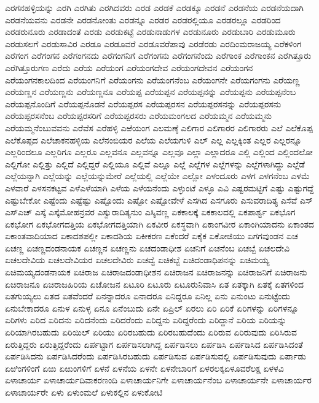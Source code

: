 {ಎರಗನಹಳ್ಳಿಯನ್ನು
ಎರಗಿ
ಎರಗಿತು
ಎರಗಿದವರು
ಎರಡ
ಎರಡಕೆ
ಎರಡಕ್ಕೂ
ಎರಡನೆ
ಎರಡನೆಯ
ಎರಡನೆಯದಾಗಿ
ಎರಡನೆಯವನು
ಎರಡನೇ
ಎರಡನೋಂತು
ಎರಡನ್ನೂ
ಎರಡರ
ಎರಡರಲ್ಲಿಯೂ
ಎರಡರಲ್ಲೂ
ಎರಡರಿಂದ
ಎರಡರುನೂರು
ಎರಡಾದಂತೆ
ಎರಡು
ಎರಡುಕಟ್ಟೆ
ಎರಡುನಾಡುಗಳ
ಎರಡುನೂರು
ಎರಡುಬಾರಿ
ಎರಡುಮೂರು
ಎರಡುಸಲಗೆ
ಎರಡುಸಾವಿರ
ಎರಡೂ
ಎರಡೂವರೆ
ಎರಡೂವರೆಪಾವು
ಎರಡೆರಡು
ಎರದಿಂಮರಾಜಯ್ಯ
ಎರೆಕಳಿಂಗ
ಎರೆಗಂಗ
ಎರೆಗಂಗನ
ಎರೆಗಂಗನದು
ಎರೆಗಂಗನಿಗೆ
ಎರೆಗಂಗನು
ಎರೆಗಂಗನೆಂದು
ಎರೆಗಾಂಕ
ಎರೆಗಾಂಕನ
ಎರೆಗಿತ್ತೂರು
ಎರೆಗಿತ್ತೂರುಗಣ
ಎರೆದು
ಎರೆಯ
ಎರೆಯಂಗ
ಎರೆಯಂಗದೇವ
ಎರೆಯಂಗದೇವನ
ಎರೆಯಂಗನ
ಎರೆಯಂಗನಕಾಲದಿಂದ
ಎರೆಯಂಗನಿಗೆ
ಎರೆಯಂಗನು
ಎರೆಯಂಗನೆಂಬ
ಎರೆಯಂಗನೇ
ಎರೆಯಗಂಗನು
ಎರೆಯಣ್ಣ
ಎರೆಯಣ್ಣನ
ಎರೆಯಣ್ಣನು
ಎರೆಯಣ್ಣನೂ
ಎರೆಯಪ್ಪ
ಎರೆಯಪ್ಪನ
ಎರೆಯಪ್ಪನನ್ನು
ಎರೆಯಪ್ಪನು
ಎರೆಯಪ್ಪನೆಂಬ
ಎರೆಯಪ್ಪನೊಂದಿಗೆ
ಎರೆಯಪ್ಪನೊಡನೆ
ಎರೆಯಪ್ಪರಸ
ಎರೆಯಪ್ಪರಸನ
ಎರೆಯಪ್ಪರಸನನ್ನು
ಎರೆಯಪ್ಪರಸನು
ಎರೆಯಪ್ಪರಸನೆಂಬ
ಎರೆಯಪ್ಪರಸರಿಗೆ
ಎರೆಯಪ್ಪರಸರು
ಎರೆಯಮಂಗಲದ
ಎರೆಯಮ್ಮನ
ಎರೆಯಮ್ಮನು
ಎರೆಯಮ್ಮನೆಂಬುವವನು
ಎರೆವೆಸ
ಎರೆಹಳ್ಳಿ
ಎಱೆಯಂಗ
ಎಲಮಣ್ಠೆ
ಎಲಿಗಾರ
ಎಲಿಗಾರರ
ಎಲಿಗಾರರು
ಎಲೆ
ಎಲೆಕೊಪ್ಪ
ಎಲೆಕೊಪ್ಪದ
ಎಲೆಚಾಕನಹಳ್ಳಿಯ
ಎಲೆನಂಬಿಯರ
ಎಲೆಯ
ಎಲೆಯಗುಳಿ
ಎಲ್
ಎಲ್ಲ
ಎಲ್ಲಕ್ಕಿಂತ
ಎಲ್ಲರ
ಎಲ್ಲರನ್ನೂ
ಎಲ್ಲರಿಂದಲೂ
ಎಲ್ಲರಿಗೂ
ಎಲ್ಲರೂ
ಎಲ್ಲವನೂ
ಎಲ್ಲವನ್ನೂ
ಎಲ್ಲವೂ
ಎಲ್ಲಾ
ಎಲ್ಲಾದರೂ
ಎಲ್ಲಿ
ಎಲ್ಲಿಂದ
ಎಲ್ಲಿಂದಲೋ
ಎಲ್ಲಿಗೋ
ಎಲ್ಲಿತ್ತು
ಎಲ್ಲಿದೆ
ಎಲ್ಲಿದ್ದರೆ
ಎಲ್ಲಿಯೂ
ಎಲ್ಲಿವೆ
ಎಲ್ಲೂ
ಎಲ್ಲೆ
ಎಲ್ಲೆಗಳ
ಎಲ್ಲೆಗಳನ್ನು
ಎಲ್ಲೆಗಳಾಗಿದ್ದು
ಎಲ್ಲೆಡೆ
ಎಲ್ಲೆಯನ್ನಾಗಿ
ಎಲ್ಲೆಯನ್ನು
ಎಲ್ಲೆಯನ್ನುಮೇರೆ
ಎಲ್ಲೆಯಲ್ಲಿ
ಎಲ್ಲೆಯೇ
ಎಲ್ಲೋ
ಎಳಂದೂರು
ಎಳಗ
ಎಳಗನೆಂಬ
ಎಳಮೆ
ಎಳವಾರೆ
ಎಳಸನಕಟ್ಟವ
ಎಳೆಎಳೆಯಾಗಿ
ಎಳೆಯ
ಎಳೆಯನೆಂದು
ಎಳ್ಳುಂಟೆ
ಎಳ್ಳೂ
ಎವಿ
ಎಷ್ಟರಮಟ್ಟಿಗೆ
ಎಷ್ಟು
ಎಷ್ಟುಗದ್ದೆ
ಎಷ್ಟುಬೇಕೋ
ಎಷ್ಟೆಂದು
ಎಷ್ಟೆಷ್ಟು
ಎಷ್ಟೊಂದು
ಎಷ್ಟೋ
ಎಷ್ಟೋವೇಳೆ
ಎಸಗಿದ
ಎಸಗೂರು
ಎಸುವರಾದಿತ್ಯ
ಎಸೆವೆ
ಎಸ್
ಎಸ್ಎಚ್
ಎಸ್ಕೆ
ಎಸ್ಕೆಮೋಹನ್ರವರ
ಎಸ್ವುರಾದಿತ್ಯನುಂ
ಎಸ್ಶಿವಣ್ಣ
ಏಕಕಾಲಕ್ಕೆ
ಏಕಕಾಲದಲ್ಲಿ
ಏಕಪಾರ್ಶ್ವ
ಏಕಭೊಗ
ಏಕಭೋಗ
ಏಕಭೋಗದತ್ತಿಯ
ಏಕಭೋಗದತ್ತಿಯಾಗಿ
ಏಕವೀರ
ಏಕಸ್ಥವಾಗಿ
ಏಕಾಂಗವೀರ
ಏಕಾಂಗಿಯಾದನು
ಏಕಾಂತದ
ಏಕಾಂತವಾದಿಯಾದ
ಏಕಾದಶಪಲ್ಲೀ
ಏಕಾದಶಿಯ
ಏಕೀಕರಣ
ಏಕೆಂದರೆ
ಏಕೈಕ
ಏಕೋಜಿಯು
ಏಗಗವುಂಡನ
ಏಚ
ಏಚಣ್ಣ
ಏಚಣ್ಣದಂಡನಾಯಕ
ಏಚಣ್ಣನ
ಏಚಣ್ಣನು
ಏಚದಂಡಾಧೀಶ
ಏಚನಿಗೆ
ಏಚನೆಂಬ
ಏಚಬ್ಬೆ
ಏಚಲದೇವಿ
ಏಚಲದೇವಿಯ
ಏಚಲದೇವಿಯರ
ಏಚಲದೇವಿರು
ಏಚವ್ವೆ
ಏಚಿಕಬ್ಬೆ
ಏಚಿದಂಡಾಧಿಪನನ್ನು
ಏಚಿಮಯ್ಯ
ಏಚಿಮಯ್ಯದಂಡನಾಯಕ
ಏಚಿರಾಜ
ಏಚಿರಾಜದಂಡಾಧೀಶನ
ಏಚಿರಾಜನ
ಏಚಿರಾಜನನ್ನು
ಏಚಿರಾಜನಿಗೆ
ಏಚಿರಾಜನು
ಏಚಿರಾಜನೂ
ಏಚಿರಾಜಹಿರಿಯ
ಏಚೋಜನ
ಏಟೂರಿ
ಏಟೂರು
ಏಟೂರುನಿವಾಸಿ
ಏತ
ಏತಕ್ಕಾಗಿ
ಏತಕ್ಕೆ
ಏತಗಳಿಂದ
ಏತಗುಯ್ಯಲು
ಏತದ
ಏತವೆಂದರೆ
ಏನನ್ನಾದರೂ
ಏನಾದರೂ
ಏನಿದ್ದರೂ
ಏನಿಲ್ಲ
ಏನು
ಏನುಂಟು
ಏನುಟ್ಟೆಂದು
ಏನುಬೇಕಾದರೂ
ಏನುಳ
ಏನುಳ್ಳ
ಏನೂ
ಏನೆಂಬುದು
ಏನೇ
ಏಪ್ರಿಲ್
ಏರಲು
ಏರಿ
ಏರಿಕೆ
ಏರಿಗಳನ್ನು
ಏರಿಗಳನ್ನೂ
ಏರಿಗಳು
ಏರಿದ
ಏರಿದನು
ಏರಿದನೆಂದು
ಏರಿದರೆಂದು
ಏರಿದ್ದನು
ಏರಿದ್ದರೆಂದು
ಏರಿದ್ದಾನೆ
ಏರಿಯ
ಏರಿಯನ್ನು
ಏರಿಯಾಗಿರಬಹುದು
ಏರಿಯಿಲ್
ಏರಿಯು
ಏರಿರಬಹುದು
ಏರಿರಬಹುದೆಂದು
ಏರಿರುವ
ಏರಿರುವುದು
ಏರಿಸಿರುವ
ಏರುತ್ತಿದ್ದರು
ಏರುತ್ತಿದ್ದರೆಂದು
ಏರ್ಪಟ್ಟಾಗ
ಏರ್ಪಡಿಸಲಾಗಿದ್ದ
ಏರ್ಪಡಿಸಲು
ಏರ್ಪಡಿಸಿ
ಏರ್ಪಡಿಸಿದ
ಏರ್ಪಡಿಸಿದಂತೆ
ಏರ್ಪಡಿಸಿದನು
ಏರ್ಪಡಿಸಿದರೆಂದು
ಏರ್ಪಡಿಸಿರಬಹುದು
ಏರ್ಪಡಿಸುವ
ಏರ್ಪಡಿಸುವಲ್ಲಿ
ಏರ್ಪಡಿಸುವುದು
ಏರ್ಪಾಡು
ಏಱಿಂಗಳಿಂಗೆ
ಏಱು
ಏಱುಂಗಳಿಗೆ
ಏಳನೆ
ಏಳನೆಯ
ಏಳನೇ
ಏಳನೇಬಾರಿಗೆ
ಏಳರಲಕ್ಕಏಳೂವರೆಲಕ್ಷ
ಏಳಳವಿ
ಏಳಾಚಾರ್ಯ
ಏಳಾಚಾರ್ಯದಿವಾಕರಣಂದಿ
ಏಳಾಚಾರ್ಯನಿಗೇ
ಏಳಾಚಾರ್ಯನೆಂಬ
ಏಳಾಚಾರ್ಯನೇ
ಏಳಾಚಾರ್ಯರ
ಏಳಾಚಾರ್ಯರೇ
ಏಳು
ಏಳುಂಮಲೆ
ಏಳುಕಲ್ಲಿನ
ಏಳುಕೋಟಿ
}

